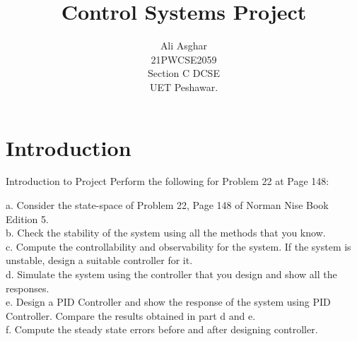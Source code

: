 \documentclass[10pt,compress,mathserif]{beamer}
\title[]{Control Systems Project}
\author[]{Ali Asghar\\ 21PWCSE2059 \\ Section C DCSE \\ UET Peshawar.}
\begin{document}
\begin{frame}    \titlepage \end{frame}



\section{Introduction}
\begin{frame}{Introduction to Project}
\noindent Perform the following for Problem 22 at Page 148:\\ \vskip10pt

a. Consider the state-space of Problem 22, Page 148 of Norman Nise Book Edition 5. \\
b. Check the stability of the system using all the methods that you know. \\
c. Compute the controllability and observability for the system. If the system is unstable, design a suitable controller for it. \\
d. Simulate the system using the controller that you design and show all the responses.\\
e. Design a PID Controller and show the response of the system using PID Controller. Compare the results obtained in part d and e.\\
f. Compute the steady state errors before and after designing controller.\\

\end{frame}
\end{document}

